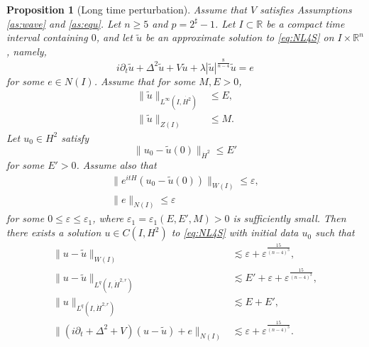 \documentclass[11pt,a4paper]{article}
\numberwithin{equation}{section}
\newtheorem{proposition}[theorem]{Proposition}
\begin{document}
\begin{proposition}[Long time perturbation]\label{prop:long time}
Assume that $V$ satisfies Assumptions \ref{as:wave} and \ref{as:equ}. Let $n \geq 5$ and $p = 2^{\sharp} - 1$.
Let $I \subset \mathbb{R}$ be a compact time interval containing $0$, and let $\tilde{u}$ be an approximate solution to \eqref{eq:NL4S} on $I \times \mathbb{R}^{n}$, namely,
\[
i\partial_{t}\tilde{u} + \Delta^{2}\tilde{u} + V\tilde{u} + \lambda|\tilde{u}|^{\frac{8}{n-4}}\tilde{u} = e
\]
for some $e \in N(I)$.
Assume that for some $M,E >0$,
\begin{align}
\|\tilde{u}\|_{L^{\infty}(I, \dot{H^{2}})} &\leq E, \\
\|\tilde{u}\|_{Z(I)} &\leq M.
\end{align}
Let $u_{0} \in H^{2}$ satisfy
\[
\|u_{0} - \tilde{u}(0) \|_{\dot{H}^{2}} \leq E'
\]
for some $E' >0$.
Assume also that
\begin{align}
\|e^{itH}\left(u_{0} - \tilde{u}(0)\right)\|_{W(I)} \leq \varepsilon, \\
\|e\|_{N(I)} \leq \varepsilon
\end{align}
for some $0 \leq \varepsilon \leq \varepsilon_{1}$, where $\varepsilon_{1} = \varepsilon_{1}(E, E', M) > 0$ is sufficiently small.
Then there exists a solution $u\in C(I, H^{2})$ to \eqref{eq:NL4S} with initial data $u_{0}$ such that
\begin{align}
\|u - \tilde{u}\|_{W(I)} &\lesssim \varepsilon + \varepsilon^{\frac{15}{(n-4)^{3}}}, \label{long stability conclusion 1}\\
\|u - \tilde{u}\|_{L^{q}(I, \dot{H}^{2, r})} &\lesssim E' + \varepsilon  + \varepsilon^{\frac{15}{(n-4)^{3}}},\label{long stability conclusion 2}\\
\|u\|_{L^{q}(I, \dot{H}^{2, r})} &\lesssim E + E', \label{long stability conclusion 3}\\
\|(i\partial_{t} + \Delta^{2} + V)(u - \tilde{u}) + e\|_{N(I)} &\lesssim \varepsilon + \varepsilon^{\frac{15}{(n-4)^{3}}}. \label{long stability conclusion 4}
\end{align}
\end{proposition}
\end{document}

